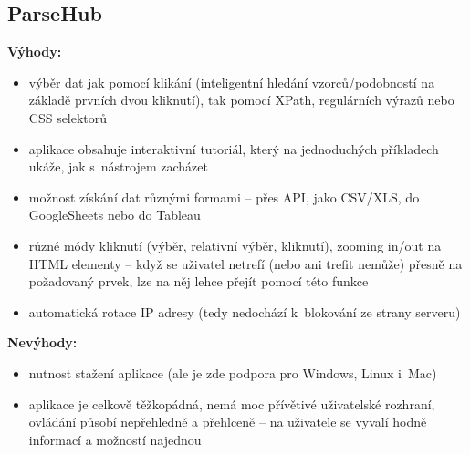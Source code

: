 \documentclass[thesis=B,czech]{FITthesis}[2012/06/26]
\begin{document}
\subsection{ParseHub}
\textbf{Výhody:}
\begin{itemize}
	\item výběr dat jak pomocí klikání (inteligentní hledání vzorců/podobností na základě prvních dvou kliknutí), tak pomocí XPath, regulárních výrazů nebo CSS selektorů
	\item aplikace obsahuje interaktivní tutoriál, který na jednoduchých příkladech ukáže, jak s~nástrojem zacházet
	\item možnost získání dat různými formami -- přes API, jako CSV/XLS, do GoogleSheets nebo do Tableau
	\item různé módy kliknutí (výběr, relativní výběr, kliknutí), zooming in/out na HTML elementy -- když se uživatel netrefí (nebo ani trefit nemůže) přesně na požadovaný prvek, lze na něj lehce přejít pomocí této funkce
	\item automatická rotace IP adresy (tedy nedochází k~blokování ze strany serveru)
\end{itemize}
\textbf{Nevýhody:}
\begin{itemize}
	\item nutnost stažení aplikace (ale je zde podpora pro Windows, Linux i~Mac)
	\item aplikace je celkově těžkopádná, nemá moc přívětivé uživatelské rozhraní, ovládání působí nepřehledně a přehlceně -- na uživatele se vyvalí hodně informací a možností najednou
\end{itemize}
\end{document}
